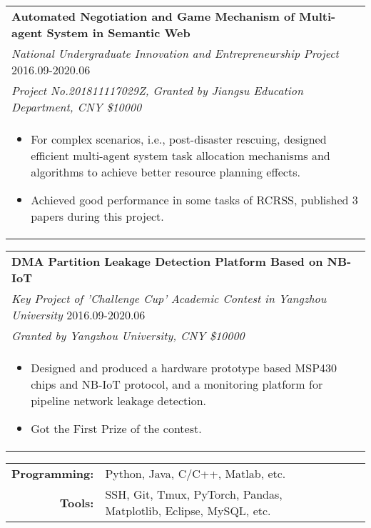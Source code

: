 \documentclass{resume}
\begin{document}
\begin{tabular*}{15.2cm}{l@{\extracolsep{\fill}}}
  \textbf{Automated Negotiation and Game Mechanism of Multi-agent System in Semantic Web}\\
  \emph{National Undergraduate Innovation and Entrepreneurship Project} \hfill 2016.09-2020.06\\
  \emph{Project No.201811117029Z, Granted by Jiangsu Education Department, CNY \$10000}\\
  \multicolumn{1}{p{15.2cm}}{
    \vspace{-0.15cm}  
  \begin{itemize}
      \item For complex scenarios, i.e., post-disaster rescuing, designed efficient multi-agent system task allocation mechanisms and algorithms to achieve better resource planning effects.
      \item Achieved good performance in some tasks of RCRSS, published 3 papers during this project.
      \end{itemize}}
  \end{tabular*}


\begin{tabular*}{15.2cm}{l@{\extracolsep{\fill}}}
\textbf{DMA Partition Leakage Detection Platform Based on NB-IoT} \\
\emph{Key Project of 'Challenge Cup' Academic Contest in Yangzhou University} \hfill 2016.09-2020.06\\
\emph{Granted by Yangzhou University, CNY \$10000}\\
\multicolumn{1}{p{15.4cm}}{
  \vspace{-0.15cm}  
\begin{itemize}
    \item Designed and produced a hardware prototype based MSP430 chips and NB-IoT protocol, and a monitoring platform for pipeline network leakage detection.
    \item Got the First Prize of the contest.
    \end{itemize}}
\end{tabular*}

\vspace{-0.4cm} 

\par
\begin{tabular}{rlll}
 \textbf{Programming:} & Python, Java, C/C++, Matlab, etc.\\
 \textbf{Tools:}  &  SSH, Git, Tmux, PyTorch, Pandas, Matplotlib, Eclipse, MySQL, etc.
\end{tabular}
\end{document}
